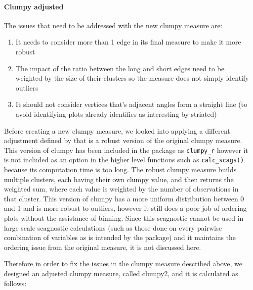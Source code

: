 \hypertarget{clumpy-adjusted}{%
\paragraph{Clumpy adjusted}\label{clumpy-adjusted}}

The issues that need to be addressed with the new clumpy measure are:

\begin{enumerate}
\def\labelenumi{\arabic{enumi}.}
\tightlist
\item
  It needs to consider more than 1 edge in its final measure to make it
  more robust
\item
  The impact of the ratio between the long and short edges need to be
  weighted by the size of their clusters so the measure does not simply
  identify outliers
\item
  It should not consider vertices that's adjacent angles form a straight
  line (to avoid identifying plots already identifies as interesting by
  striated)
\end{enumerate}

Before creating a new clumpy measure, we looked into applying a
different adjustment defined by \citet{robust} that is a robust version
of the original clumpy measure. This version of clumpy has been included
in the package as \texttt{clumpy\_r} however it is not included as an
option in the higher level functions such as \texttt{calc\_scags()}
because its computation time is too long. The robust clumpy measure
builds multiple clusters, each having their own clumpy value, and then
returns the weighted sum, where each value is weighted by the number of
observations in that cluster. This version of clumpy has a more uniform
distribution between 0 and 1 and is more robust to outliers, however it
still does a poor job of ordering plots without the assistance of
binning. Since this scagnostic cannot be used in large scale scagnostic
calculations (such as those done on every pairwise combination of
variables as is intended by the package) and it maintains the ordering
issue from the original measure, it is not discussed here.

Therefore in order to fix the issues in the clumpy measure described
above, we designed an adjusted clumpy measure, called clumpy2, and it is
calculated as follows:

